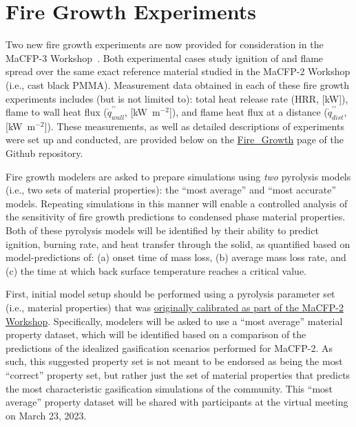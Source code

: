 \documentclass[12pt]{article}
\newcommand{\pp}{\prime\prime}
\begin{document}
\clearpage
\section{Fire Growth Experiments}
\label{Sec:Fire Growth}
Two new fire growth experiments are now provided for consideration in the MaCFP-3 Workshop~\cite{chaudhari2021experimental, Leventon2022ParallelPanel}. Both experimental cases study ignition of and flame spread over the same exact reference material studied in the MaCFP-2 Workshop (i.e., cast black PMMA). Measurement data obtained in each of these fire growth experiments includes (but is not limited to): total heat release rate (HRR, [kW]), flame to wall heat flux ($\dot{q}^{\pp}_{wall}$, [kW~m$^{-2}$]), and flame heat flux at a distance ($\dot{q}^{\pp}_{dist}$, [kW~m$^{-2}$]). These measurements, as well as detailed descriptions of experiments were set up and conducted, are provided below on the \href{https://github.com/MaCFP/macfp-db/tree/master/Fire_Growth}{Fire\_Growth} page of the Github repository.

Fire growth modelers are asked to prepare simulations using \emph{two} pyrolysis models (i.e., two sets of material properties): the ``most average'' and ``most accurate'' models. Repeating simulations in this manner will enable a controlled analysis of the sensitivity of fire growth predictions to condensed phase material properties. Both of these pyrolysis models will be identified by their ability to predict ignition, burning rate, and heat transfer through the solid, as quantified based on model-predictions of: (a) onset time of mass loss, (b) average mass loss rate, and (c) the time at which back surface temperature reaches a critical value.

First, initial model setup should be performed using a pyrolysis parameter set (i.e., material properties) that was \href{https://github.com/MaCFP/matl-db/tree/master/PMMA/Material_Properties}{originally calibrated as part of the MaCFP-2 Workshop}. Specifically, modelers will be asked to use a ``most average'' material property dataset, which will be identified based on a comparison of the predictions of the idealized gasification scenarios performed for MaCFP-2. As such, this suggested property set is not meant to be endorsed as being the most ``correct'' property set, but rather just the set of material properties that predicts the most characteristic gasification simulations of the community. This ``most average'' property dataset will be shared with participants at the virtual meeting on March 23, 2023.
\end{document}
